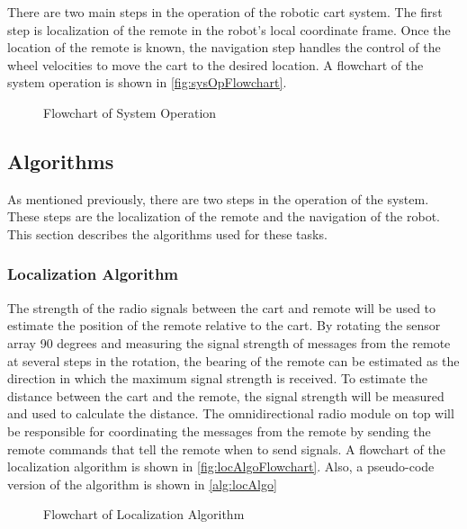 \documentclass[letterpaper,12pt]{article}   %
\begin{document}
\vspace*{12pt}
\noindent
There are two main steps in the operation of the robotic cart system. The first step is localization of the remote in the robot's local coordinate frame. Once the location of the remote is known, the navigation step handles the control of the wheel velocities to move the cart to the desired location. A flowchart of the system operation is shown in \autoref{fig:sysOpFlowchart}.

\begin{figure}
  \centering
  
  \caption{Flowchart of System Operation}
  \label{fig:sysOpFlowchart}
\end{figure}

\subsection{Algorithms}
As mentioned previously, there are two steps in the operation of the system. These steps are the localization of the remote and the navigation of the robot. This section describes the algorithms used for these tasks.

\subsubsection{Localization Algorithm}
The strength of the radio signals between the cart and remote will be used to estimate the position of the remote relative to the cart. By rotating the sensor array 90 degrees and measuring the signal strength of messages from the remote at several steps in the rotation, the bearing of the remote can be estimated as the direction in which the maximum signal strength is received. To estimate the distance between the cart and the remote, the signal strength will be measured and used to calculate the distance. The omnidirectional radio module on top will be responsible for coordinating the messages from the remote by sending the remote commands that tell the remote when to send signals. A flowchart of the localization algorithm is shown in \autoref{fig:locAlgoFlowchart}. Also, a pseudo-code version of the algorithm is shown in \autoref{alg:locAlgo}

\begin{figure}
  \centering
  
  \caption{Flowchart of Localization Algorithm}
  \label{fig:locAlgoFlowchart}
\end{figure}
\end{document}
